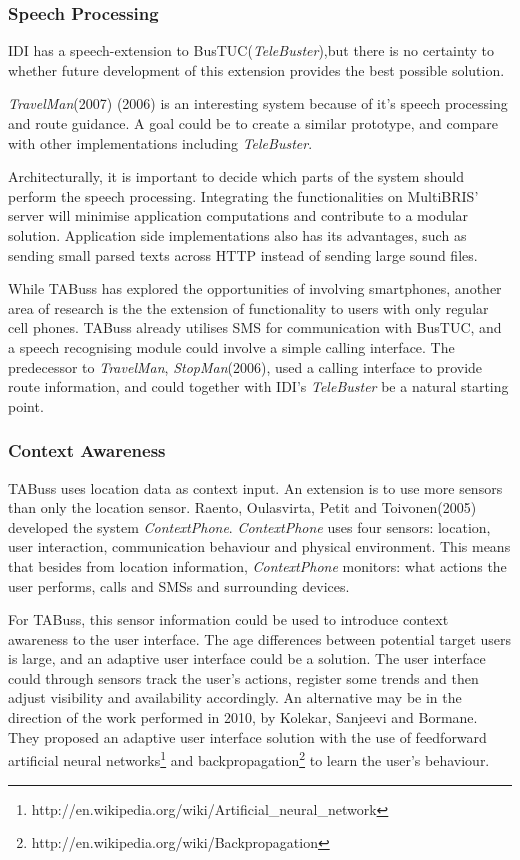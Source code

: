 \subsubsection{Speech Processing}
IDI has a speech-extension to BusTUC(\emph{TeleBuster}),but there is no certainty to whether future development of this extension provides the best possible solution.

\emph{TravelMan}(2007)\cite {Turunen_designof} (2006)\cite{Turunen06evaluationof} is an interesting system because of it's speech processing and route guidance. A goal could be to create a similar prototype, and compare with other implementations including \emph{TeleBuster}. 

Architecturally, it is important to decide which parts of the system should perform the speech processing. Integrating the functionalities on MultiBRIS' server will minimise application computations and contribute to a modular solution. Application side implementations also has its advantages, such as sending small parsed texts across HTTP instead of sending large sound files. 

While TABuss has explored the opportunities of involving smartphones, another area of research is the the extension of functionality to users with only regular cell phones. TABuss already utilises SMS for communication with BusTUC, and a speech recognising module could involve a simple calling interface. The predecessor to \emph{TravelMan}, \emph{StopMan}\cite{Turunen_mobilespeech-based}(2006), used a calling interface to provide route information, and could together with IDI's \emph{TeleBuster} be a natural starting point.

\subsubsection{Context Awareness}
TABuss uses location data as context input. An extension is to use more sensors than only the location sensor. Raento, Oulasvirta, Petit and Toivonen(2005) developed the system \emph{ContextPhone}\cite{raento}. \emph{ContextPhone} uses four sensors: location, user interaction, communication behaviour and physical environment. This means that besides from location information, \emph{ContextPhone} monitors: what actions the user performs, calls and SMSs and surrounding devices. 

For TABuss, this sensor information could be used to introduce context awareness to the user interface. The age differences between potential target users is large, and an adaptive user interface could be a solution. The user interface could through sensors track the user's actions, register some trends and then adjust visibility and availability accordingly. An alternative may be in the direction of the work performed in 2010, by Kolekar, Sanjeevi and Bormane\cite{ANN}. They proposed an adaptive user interface solution with the use of feedforward artificial neural networks\footnote{http://en.wikipedia.org/wiki/Artificial\_neural\_network} and backpropagation\footnote{http://en.wikipedia.org/wiki/Backpropagation} to learn the user's behaviour.

